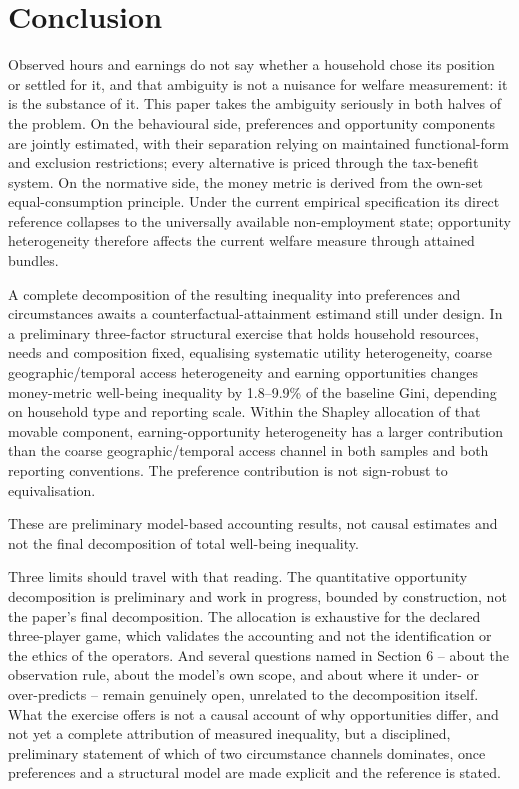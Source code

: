 \documentclass[11pt,a4paper]{article}
\begin{document}
\section{Conclusion}\label{conclusion}

Observed hours and earnings do not say whether a household chose its position or settled for it, and that ambiguity is not a nuisance for welfare measurement: it is the substance of it. This paper takes the ambiguity seriously in both halves of the problem. On the behavioural side, preferences and opportunity components are jointly estimated, with their separation relying on maintained functional-form and exclusion restrictions; every alternative is priced through the tax-benefit system. On the normative side, the money metric is derived from the own-set equal-consumption principle. Under the current empirical specification its direct reference collapses to the universally available non-employment state; opportunity heterogeneity therefore affects the current welfare measure through attained bundles.

A complete decomposition of the resulting inequality into preferences and circumstances awaits a counterfactual-attainment estimand still under design. In a preliminary three-factor structural exercise that holds household resources, needs and composition fixed, equalising systematic utility heterogeneity, coarse geographic/temporal access heterogeneity and earning opportunities changes money-metric well-being inequality by 1.8--9.9\% of the baseline Gini, depending on household type and reporting scale. Within the Shapley allocation of that movable component, earning-opportunity heterogeneity has a larger contribution than the coarse geographic/temporal access channel in both samples and both reporting conventions. The preference contribution is not sign-robust to equivalisation.

These are preliminary model-based accounting results, not causal estimates and not the final decomposition of total well-being inequality.

Three limits should travel with that reading. The quantitative opportunity decomposition is preliminary and work in progress, bounded by construction, not the paper's final decomposition. The allocation is exhaustive for the declared three-player game, which validates the accounting and not the identification or the ethics of the operators. And several questions named in Section 6 -- about the observation rule, about the model's own scope, and about where it under- or over-predicts -- remain genuinely open, unrelated to the decomposition itself. What the exercise offers is not a causal account of why opportunities differ, and not yet a complete attribution of measured inequality, but a disciplined, preliminary statement of which of two circumstance channels dominates, once preferences and a structural model are made explicit and the reference is stated.
\end{document}
